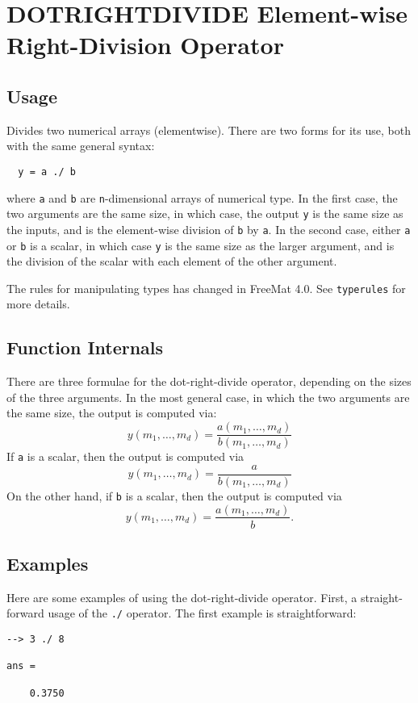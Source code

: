 \section{DOTRIGHTDIVIDE Element-wise Right-Division Operator}

\subsection{Usage}

Divides two numerical arrays (elementwise).  There are two forms
for its use, both with the same general syntax:
\begin{verbatim}
  y = a ./ b
\end{verbatim}
where \verb|a| and \verb|b| are \verb|n|-dimensional arrays of numerical type.  In the
first case, the two arguments are the same size, in which case, the 
output \verb|y| is the same size as the inputs, and is the element-wise
division of \verb|b| by \verb|a|.  In the second case, either \verb|a| or \verb|b| is a scalar, 
in which case \verb|y| is the same size as the larger argument,
and is the division of the scalar with each element of the other argument.

The rules for manipulating types has changed in FreeMat 4.0.  See \verb|typerules|
for more details.

\subsection{Function Internals}

There are three formulae for the dot-right-divide operator, depending on the
sizes of the three arguments.  In the most general case, in which 
the two arguments are the same size, the output is computed via:
\[
y(m_1,\ldots,m_d) = \frac{a(m_1,\ldots,m_d)}{b(m_1,\ldots,m_d)}
\]
If \verb|a| is a scalar, then the output is computed via
\[
y(m_1,\ldots,m_d) = \frac{a}{b(m_1,\ldots,m_d)}
\]
On the other hand, if \verb|b| is a scalar, then the output is computed via
\[
y(m_1,\ldots,m_d) = \frac{a(m_1,\ldots,m_d)}{b}.
\]
\subsection{Examples}

Here are some examples of using the dot-right-divide operator.  First, a 
straight-forward usage of the \verb|./| operator.  The first example
is straightforward:
\begin{verbatim}
--> 3 ./ 8

ans = 

    0.3750 
\end{verbatim}

